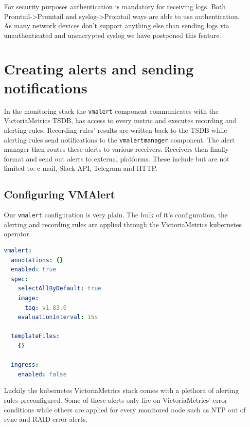 For security purposes authentication is mandatory for receiving logs. Both
Promtail->Promtail and syslog->Promtail ways are able to use authentication. As
many network devices don't support anything else than sending logs via
unauthenticated and unencrypted syslog we have postponed this feature.

\section{Creating alerts and sending notifications}

In the monitoring stack the \verb+vmalert+ component communicates with the
VictoriaMetrics TSDB, has access to every metric and executes recording and
alerting rules. Recording rules' results are written back to the TSDB while
alerting rules send notifications to the \verb+vmalertmanager+ component. The
alert manager then routes these alerts to various receivers. Receivers then
finally format and send out alerts to external platforms. These include but are
not limited to: e-mail, Slack API, Telegram and HTTP.

\subsection{Configuring VMAlert}

Our \verb+vmalert+ configuration is very plain. The bulk of it's configuration,
the alerting and recording rules are applied through the VictoriaMetrics
kubernetes operator.

\begin{lstlisting}[language=yaml,caption=vmalert configuration]
vmalert:
  annotations: {}
  enabled: true
  spec:
    selectAllByDefault: true
    image:
      tag: v1.83.0
    evaluationInterval: 15s

  templateFiles:
    {}

  ingress:
    enabled: false
\end{lstlisting}

Luckily the kubernetes VictoriaMetrics stack comes with a plethora of alerting
rules preconfigured. Some of these alerts only fire on VictoriaMetrics' error
conditions while others are applied for every monitored node such as NTP out of
sync and RAID error alerts.

